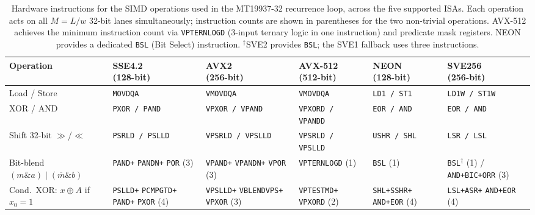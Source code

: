 \documentclass[preprint,1p,times]{elsarticle}
\begin{document}
\begin{table}[h!]
  \centering\footnotesize
  \renewcommand{\arraystretch}{1.4}
  \begin{tabular}{|l|p{2.0cm}|p{2.1cm}|p{2.4cm}|p{1.9cm}|p{2.0cm}|}
    \hline
    \textbf{Operation} &
    \shortstack[c]{\textbf{SSE4.2} \\ \textbf{(128-bit)}} &
    \shortstack[c]{\textbf{AVX2} \\ \textbf{(256-bit)}} &
    \shortstack[c]{\textbf{AVX-512} \\ \textbf{(512-bit)}} &
    \shortstack[c]{\textbf{NEON} \\ \textbf{(128-bit)}} &
    \shortstack[c]{\textbf{SVE256} \\ \textbf{(256-bit)}} \\
    \hline
    Load / Store &
    \texttt{MOVDQA} &
    \texttt{VMOVDQA} &
    \texttt{VMOVDQA} &
    \texttt{LD1 / ST1} &
    \texttt{LD1W / ST1W} \\
    \hline
    XOR / AND &
    \texttt{PXOR / PAND} &
    \texttt{VPXOR / VPAND} &
    \texttt{VPXORD / VPANDD} &
    \texttt{EOR / AND} &
    \texttt{EOR / AND} \\
    \hline
    Shift 32-bit $\gg$/$\ll$ &
    \texttt{PSRLD / PSLLD} &
    \texttt{VPSRLD / VPSLLD} &
    \texttt{VPSRLD / VPSLLD} &
    \texttt{USHR / SHL} &
    \texttt{LSR / LSL} \\
    \hline
    Bit-blend $(m \mathbin{\&} a) \mid (\overline{m} \mathbin{\&} b)$ &
    \texttt{PAND+} \texttt{PANDN+} \texttt{POR} (3) &
    \texttt{VPAND+} \texttt{VPANDN+} \texttt{VPOR} (3) &
    \texttt{VPTERNLOGD} (1) &
    \texttt{BSL} (1) &
    \texttt{BSL}$^{\dagger}$ (1) / \texttt{AND+BIC+ORR} (3) \\
    \hline
    Cond.\ XOR: $x \oplus A$ if $x_0{=}1$ &
    \texttt{PSLLD+} \texttt{PCMPGTD+} \texttt{PAND+} \texttt{PXOR} (4) &
    \texttt{VPSLLD+} \texttt{VBLENDVPS+} \texttt{VPXOR} (3) &
    \texttt{VPTESTMD+} \texttt{VPXORD} (2) &
    \texttt{SHL+SSHR+} \texttt{AND+EOR} (4) &
    \texttt{LSL+ASR+} \texttt{AND+EOR} (4) \\
    \hline
  \end{tabular}
  \caption{\label{tab:intrinsics}Hardware instructions for the SIMD operations used in the MT19937-32 recurrence loop, across the five supported ISAs. Each operation acts on all $M = L/w$ 32-bit lanes simultaneously; instruction counts are shown in parentheses for the two non-trivial operations. AVX-512 achieves the minimum instruction count via \texttt{VPTERNLOGD} (3-input ternary logic in one instruction) and predicate mask registers. NEON provides a dedicated \texttt{BSL} (Bit Select) instruction. $^{\dagger}$SVE2 provides \texttt{BSL}; the SVE1 fallback uses three instructions.}
\end{table}
\end{document}
